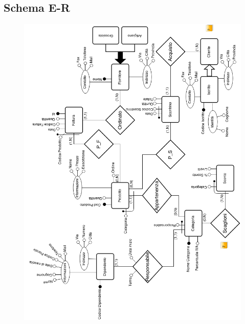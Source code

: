 \subsection{Schema E-R}

\begin{figure}[h!]
\includegraphics[scale=0.52]{include/progettazioneConcettuale/schemaER/output}
\end{figure}

